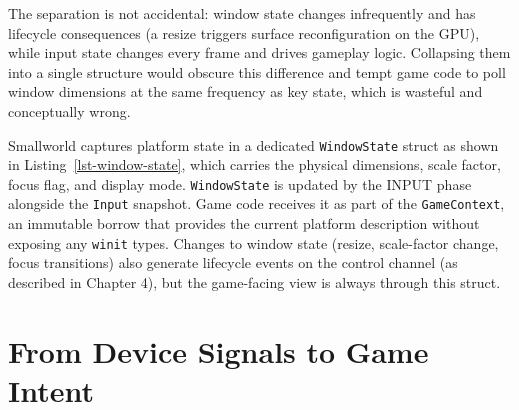 \documentclass[
  11pt,
  letterpaper,
  DIV=11,
  numbers=noendperiod,
  twoside,
  open=right]{scrreprt}
\newenvironment{Shaded}{}{}
\newcommand{\DataTypeTok}[1]{\textcolor[rgb]{0.84,0.23,0.29}{#1}}
\newcommand{\KeywordTok}[1]{\textcolor[rgb]{0.84,0.23,0.29}{#1}}
\newcommand{\NormalTok}[1]{\textcolor[rgb]{0.14,0.16,0.18}{#1}}
\newcommand{\OperatorTok}[1]{\textcolor[rgb]{0.14,0.16,0.18}{#1}}
\renewenvironment{Shaded}{\begin{snugshade}\small\setstretch{0.95}}{\end{snugshade}}
\begin{document}
The separation is not accidental: window state changes infrequently and
has lifecycle consequences (a resize triggers surface reconfiguration on
the GPU), while input state changes every frame and drives gameplay
logic. Collapsing them into a single structure would obscure this
difference and tempt game code to poll window dimensions at the same
frequency as key state, which is wasteful and conceptually wrong.

\begin{codelisting}

\caption{\label{lst-window-state}WindowState: the game-visible platform
description}

\centering{

\begin{Shaded}
\begin{Highlighting}[]
\KeywordTok{struct}\NormalTok{ WindowState }\OperatorTok{\{}
\NormalTok{    width}\OperatorTok{:}        \DataTypeTok{u32}\OperatorTok{,}
\NormalTok{    height}\OperatorTok{:}       \DataTypeTok{u32}\OperatorTok{,}
\NormalTok{    scale\_factor}\OperatorTok{:} \DataTypeTok{f64}\OperatorTok{,}
\NormalTok{    focused}\OperatorTok{:}      \DataTypeTok{bool}\OperatorTok{,}
\NormalTok{    mode}\OperatorTok{:}\NormalTok{         WindowMode}\OperatorTok{,}
\OperatorTok{\}}
\end{Highlighting}
\end{Shaded}

}

\end{codelisting}%

Smallworld captures platform state in a dedicated \texttt{WindowState}
struct as shown in Listing~\ref{lst-window-state}, which carries the
physical dimensions, scale factor, focus flag, and display mode.
\texttt{WindowState} is updated by the INPUT phase alongside the
\texttt{Input} snapshot. Game code receives it as part of the
\texttt{GameContext}, an immutable borrow that provides the current
platform description without exposing any \texttt{winit} types. Changes
to window state (resize, scale-factor change, focus transitions) also
generate lifecycle events on the control channel (as described in
Chapter 4), but the game-facing view is always through this struct.

\section{From Device Signals to Game Intent}\label{sec-device-to-intent}
\end{document}
